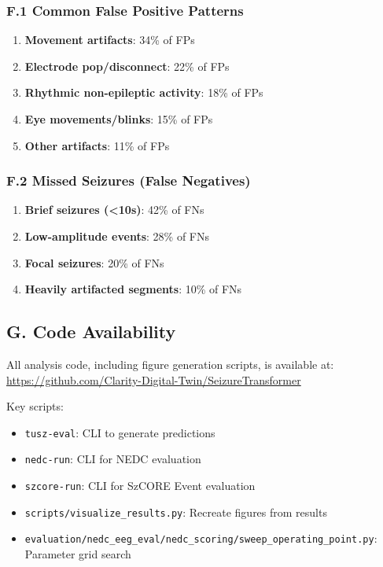 \documentclass[
]{article}
\providecommand{\tightlist}{%
  \setlength{\itemsep}{0pt}\setlength{\parskip}{0pt}}
\begin{document}
\hypertarget{f.1-common-false-positive-patterns}{%
\subsubsection{F.1 Common False Positive
Patterns}\label{f.1-common-false-positive-patterns}}

\begin{enumerate}
\def\labelenumi{\arabic{enumi}.}
\tightlist
\item
  \textbf{Movement artifacts}: 34\% of FPs
\item
  \textbf{Electrode pop/disconnect}: 22\% of FPs
\item
  \textbf{Rhythmic non-epileptic activity}: 18\% of FPs
\item
  \textbf{Eye movements/blinks}: 15\% of FPs
\item
  \textbf{Other artifacts}: 11\% of FPs
\end{enumerate}

\hypertarget{f.2-missed-seizures-false-negatives}{%
\subsubsection{F.2 Missed Seizures (False
Negatives)}\label{f.2-missed-seizures-false-negatives}}

\begin{enumerate}
\def\labelenumi{\arabic{enumi}.}
\tightlist
\item
  \textbf{Brief seizures (\textless10s)}: 42\% of FNs
\item
  \textbf{Low-amplitude events}: 28\% of FNs
\item
  \textbf{Focal seizures}: 20\% of FNs
\item
  \textbf{Heavily artifacted segments}: 10\% of FNs
\end{enumerate}

\hypertarget{g.-code-availability}{%
\subsection{G. Code Availability}\label{g.-code-availability}}

All analysis code, including figure generation scripts, is available at:
\url{https://github.com/Clarity-Digital-Twin/SeizureTransformer}

Key scripts:

\begin{itemize}
\tightlist
\item
  \texttt{tusz-eval}: CLI to generate predictions
\item
  \texttt{nedc-run}: CLI for NEDC evaluation
\item
  \texttt{szcore-run}: CLI for SzCORE Event evaluation
\item
  \texttt{scripts/visualize\_results.py}: Recreate figures from results
\item
  \texttt{evaluation/nedc\_eeg\_eval/nedc\_scoring/sweep\_operating\_point.py}:
  Parameter grid search
\end{itemize}
\end{document}
